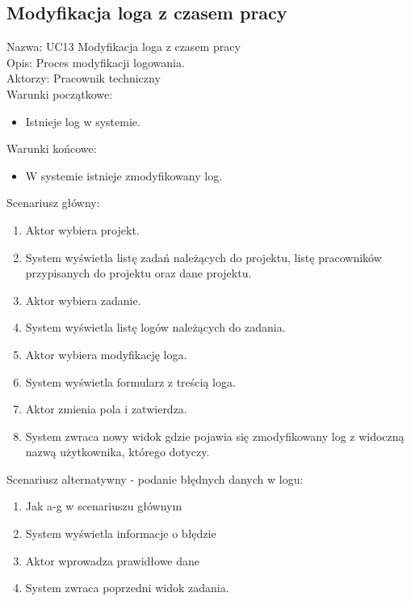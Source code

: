 \subsection{Modyfikacja loga z czasem pracy}
Nazwa: UC13 Modyfikacja loga z czasem pracy \\
Opis: Proces modyfikacji logowania.\\
Aktorzy: Pracownik techniczny \\
Warunki początkowe:
\begin{itemize}
\item Istnieje log w systemie.
\end{itemize}
Warunki końcowe:
\begin{itemize}
\item W systemie istnieje zmodyfikowany log.
\end{itemize}
Scenariusz główny:
\begin{enumerate}
\item Aktor wybiera projekt.
\item System wyświetla listę zadań należących do projektu, listę pracowników przypisanych do projektu oraz dane projektu.
\item Aktor wybiera zadanie.
\item System wyświetla listę logów należących do zadania.
\item Aktor wybiera modyfikację loga.
\item System wyświetla formularz z treścią loga.
\item Aktor zmienia pola i zatwierdza.
\item System zwraca nowy widok gdzie pojawia się zmodyfikowany log z widoczną nazwą użytkownika, którego dotyczy.
\end{enumerate}
Scenariusz alternatywny - podanie błędnych danych w logu: 
\begin{enumerate}
\item Jak a-g w scenariuszu głównym
\item System wyświetla informacje o błędzie
\item Aktor wprowadza prawidłowe dane
\item System zwraca poprzedni widok zadania.
\end{enumerate}


